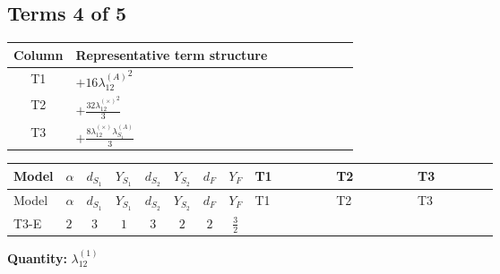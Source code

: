 \documentclass[8pt]{article}
\begin{document}
\begin{landscape}
\subsection*{Terms 4 of 5}
\begin{center}
\begin{tabular}{@{}c >{\raggedright\arraybackslash}p{0.82\linewidth}@{}}
\toprule
Column & Representative term structure \\
\midrule
T1 & \(\displaystyle +16 {\lambda_{12}^{(A)}}^2\) \\
\midrule
T2 & \(\displaystyle +\frac{32 {\lambda_{12}^{(\times)}}^2}{3}\) \\
\midrule
T3 & \(\displaystyle +\frac{8 {\lambda_{12}^{(\times)}} {\lambda_{S_1}^{(A)}}}{3}\) \\
\midrule
\bottomrule
\end{tabular}
\end{center}
\smallskip
\tiny
\begin{longtable}{@{}llcccccc >{\raggedright\arraybackslash}p{0.21\linewidth} >{\raggedright\arraybackslash}p{0.21\linewidth} >{\raggedright\arraybackslash}p{0.21\linewidth}@{}}
\toprule
Model & $\alpha$ & $d_{S_1}$ & $Y_{S_1}$ & $d_{S_2}$ & $Y_{S_2}$ & $d_F$ & $Y_F$ & T1 & T2 & T3 \\
\midrule
\endfirsthead
\toprule
Model & $\alpha$ & $d_{S_1}$ & $Y_{S_1}$ & $d_{S_2}$ & $Y_{S_2}$ & $d_F$ & $Y_F$ & T1 & T2 & T3 \\
\midrule
\endhead
T3-E & $2$ & $3$ & $1$ & $3$ & $2$ & $2$ & $\frac{3}{2}$ & \scriptsize\adjustbox{max width=\linewidth}{$\begin{gathered} +16 {\lambda_{12}^{(A)}}^2\end{gathered}$} & \scriptsize\adjustbox{max width=\linewidth}{$\begin{gathered} +\frac{32 {\lambda_{12}^{(\times)}}^2}{3}\end{gathered}$} & \scriptsize\adjustbox{max width=\linewidth}{$\begin{gathered} +\frac{8 {\lambda_{12}^{(\times)}} {\lambda_{S_1}^{(A)}}}{3}\end{gathered}$} \\
\midrule
\bottomrule
\end{longtable}
\clearpage
\noindent\textbf{Quantity: }$\lambda_{12}^{(1)}$\par\smallskip

\end{landscape}
\end{document}
